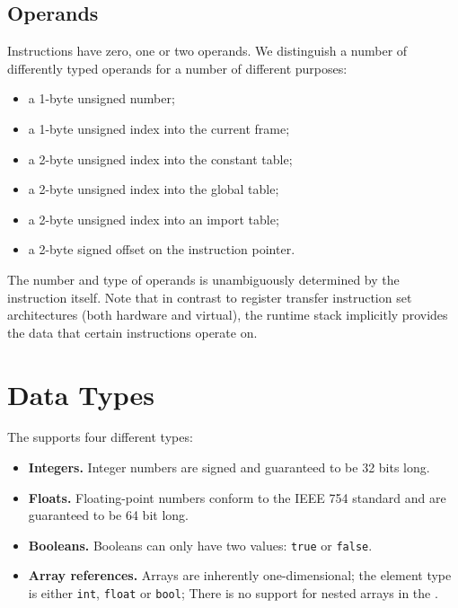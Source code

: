 \subsection{Operands}

Instructions have zero, one or two operands. We distinguish a number of differently typed operands for a number of different purposes:

\begin{itemize}
    \item a 1-byte unsigned number;
    \item a 1-byte unsigned index into the current frame;
    \item a 2-byte unsigned index into the constant table;
    \item a 2-byte unsigned index into the global table;
    \item a 2-byte unsigned index into an import table;
    \item a 2-byte signed offset on the instruction pointer.
\end{itemize}

The number and type of operands is unambiguously determined by the instruction itself. Note that in contrast to register transfer instruction set architectures (both hardware and virtual), the runtime stack implicitly provides the data that certain instructions operate on.


\section{Data Types}
The \civicvm{} supports four different types:

\begin{itemize}
    \item\textbf{Integers.} Integer numbers are signed and guaranteed to be 32 bits long.
    
    \item\textbf{Floats.} Floating-point numbers conform to the IEEE 754 standard and are guaranteed to be 64 bit long.
    
    \item\textbf{Booleans.} Booleans can only have two values: \texttt{true} or \texttt{false}.
    
    \item\textbf{Array references.} Arrays are inherently one-dimensional; the element type is either \texttt{int}, \texttt{float} or \texttt{bool}; There is no support for nested arrays in the \civicvm{}.
\end{itemize}

